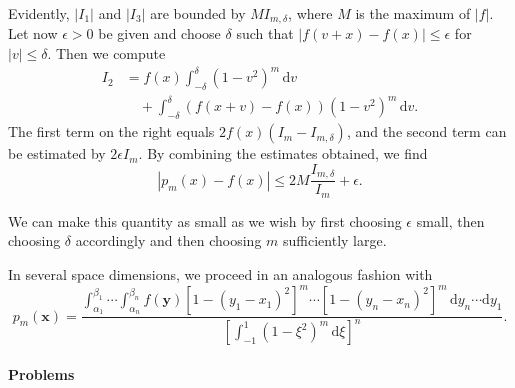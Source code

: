 \begin{Proof}
Evidently, $|I_1|$ and $|I_3|$ are bounded by $MI_{m,\delta}$, where $M$ is the maximum of $|f|$. Let now $\epsilon>0$ be given and choose $\delta$ such that $|f(v+x)-f(x)|\leq\epsilon$ for $|v|\leq\delta$. Then we compute
\begin{equation}\label{eq:weierstrass-central-integral}
\begin{aligned}
I_2&=f(x)\int_{-\delta}^{\delta}(1-v^2)^m\,\mathrm{d}v\\
&\quad+\int_{-\delta}^{\delta}(f(x+v)-f(x))(1-v^2)^m\,\mathrm{d}v.
\end{aligned}
\end{equation}
The first term on the right equals $2f(x)(I_m-I_{m,\delta})$, and the second term can be estimated by $2\epsilon I_m$. By combining the estimates obtained, we find
\begin{equation}\label{eq:weierstrass-uniform-error-estimate}
|p_m(x)-f(x)|\leq2M\dfrac{I_{m,\delta}}{I_m}+\epsilon.
\end{equation}


We can make this quantity as small as we wish by first choosing $\epsilon$ small, then choosing $\delta$ accordingly and then choosing $m$ sufficiently large.

In several space dimensions, we proceed in an analogous fashion with
\begin{equation}\label{eq:weierstrass-multivariable-polynomial}
p_m(\bm{x})=\dfrac{\int_{\alpha_1}^{\beta_1}\cdots\int_{\alpha_n}^{\beta_n}f(\bm{y})[1-(y_1-x_1)^2]^m\cdots[1-(y_n-x_n)^2]^m\,\mathrm{d}y_n\cdots\mathrm{d}y_1}{\left[\int_{-1}^1(1-\xi^2)^m\,\mathrm{d}\xi\right]^n}.
\end{equation}
\end{Proof}

\paragraph*{Problems}

